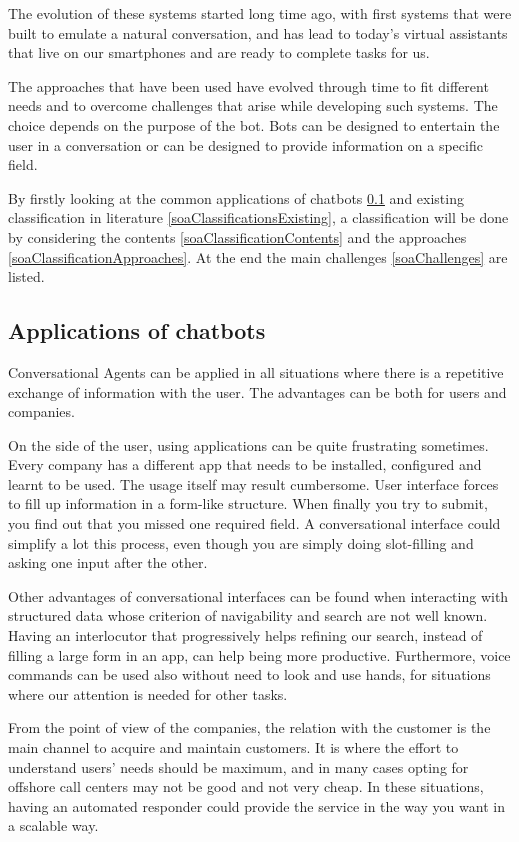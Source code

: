The evolution of these systems started long time ago, with first systems that were built to emulate a natural conversation, and has lead to today's virtual assistants that live on our smartphones and are ready to complete tasks for us.

The approaches that have been used have evolved through time to fit different needs and to overcome challenges that arise while developing such systems. The choice depends on the purpose of the bot. Bots can be designed to entertain the user in a conversation or can be designed to provide information on a specific field.

By firstly looking at the common applications of chatbots \ref{soaApplications} and existing classification in literature \ref{soaClassificationsExisting}, a classification will be done by considering the contents \ref{soaClassificationContents} and the approaches \ref{soaClassificationApproaches}. At the end the main challenges \ref{soaChallenges} are listed.

\subsection{Applications of chatbots}
\label{soaApplications}

Conversational Agents can be applied in all situations where there is a repetitive exchange of information with the user. The advantages can be both for users and companies.

On the side of the user, using applications can be quite frustrating sometimes. Every company has a different app that needs to be installed, configured and learnt to be used. The usage itself may result cumbersome. User interface forces to fill up information in a form-like structure. When finally you try to submit, you find out that you missed one required field. A conversational interface could simplify a lot this process, even though you are simply doing slot-filling and asking one input after the other.

Other advantages of conversational interfaces can be found when interacting with structured data whose criterion of navigability and search are not well known. Having an interlocutor that progressively helps refining our search, instead of filling a large form in an app, can help being more productive. Furthermore, voice commands can be used also without need to look and use hands, for situations where our attention is needed for other tasks.

From the point of view of the companies, the relation with the customer is the main channel to acquire and maintain customers. It is where the effort to understand users' needs should be maximum, and in many cases opting for offshore call centers may not be good and not very cheap. In these situations, having an automated responder could provide the service in the way you want in a scalable way.

